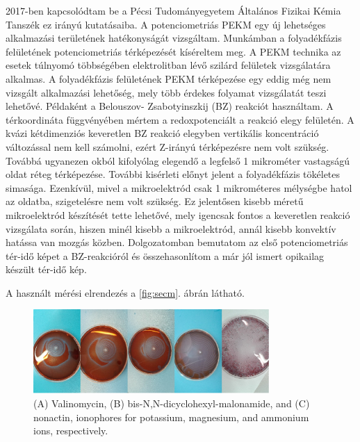 2017-ben kapcsolódtam be a Pécsi Tudományegyetem Általános Fizikai Kémia Tanszék ez irányú kutatásaiba. A potenciometriás PEKM egy új lehetséges alkalmazási területének hatékonyságát vizsgáltam. Munkámban a folyadékfázis felületének potenciometriás térképezését kíséreltem meg. A PEKM technika az esetek túlnyomó többségében elektrolitban lévő szilárd felületek vizsgálatára alkalmas. A folyadékfázis felületének PEKM térképezése egy eddig még nem vizsgált alkalmazási lehetőség, mely több érdekes folyamat vizsgálatát teszi lehetővé. Példaként a Belouszov- Zsabotyinszkij (BZ) reakciót használtam. A térkoordináta függvényében mértem a redoxpotenciált a reakció elegy felületén. A kvázi kétdimenziós keveretlen BZ reakció elegyben vertikális koncentráció változással nem kell számolni, ezért Z-irányú térképezésre nem volt szükség. Továbbá ugyanezen okból kifolyólag elegendő a legfelső 1 mikrométer vastagságú oldat réteg térképezése. További kisérleti előnyt jelent a folyadékfázis tökéletes simasága. Ezenkívül, mivel a mikroelektród csak 1 mikrométeres mélységbe hatol az oldatba, szigetelésre nem volt szükség. Ez jelentősen kisebb méretű mikroelektród készítését tette lehetővé, mely igencsak fontos a keveretlen reakció vizsgálata során, hiszen minél kisebb a mikroelektród, annál kisebb konvektív hatássa van mozgás közben. Dolgozatomban bemutatom  az első potenciometriás tér-idő képet a BZ-reakcióról és összehasonlítom a már jól ismert opikailag készült tér-idő kép.
 

A használt mérési elrendezés a \ref{fig:secm}. ábrán látható.



\begin{figure}[h]
\centering
\includegraphics[width=0.8\textwidth]{img/oscillating_reaction.jpg}
\caption{(A) Valinomycin, (B) bis-N,N-dicyclohexyl-malonamide, and (C) nonactin, ionophores for potassium, magnesium, and ammonium ions, respectively.}
\label{fig:ionophores}
\end{figure}

